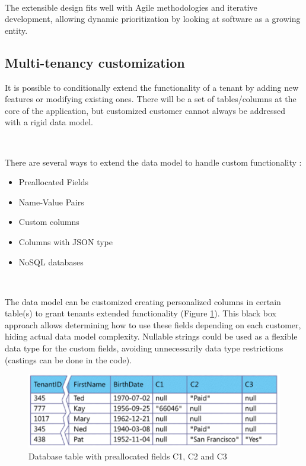 \documentclass[12pt,english]{article} %
\begin{document}

\

The extensible design fits well with Agile methodologies and iterative development, allowing dynamic prioritization \cite{philosophy-extensible-software} by looking at software as a growing entity.


\subsection{Multi-tenancy customization}
It is possible to conditionally extend the functionality of a tenant by adding new features or modifying existing ones.
There will be a set of tables/columns at the core of the application, but customized customer cannot always be addressed with a rigid data model.

\

There are several ways to extend the data model to handle custom functionality \cite{multi-tenant-data-architecture}:
\begin{itemize}
    \item Preallocated Fields
    \item Name‐Value Pairs
    \item Custom columns
    \item Columns with JSON type
    \item NoSQL databases
\end{itemize}

\

The data model can be customized creating personalized columns in certain table(s) to grant tenants extended functionality \cite{multi-tenant-data-architecture} (Figure \ref{fig:preallocated-database-fields}).
This black box approach allows determining how to use these fields depending on each customer, hiding actual data model complexity.
Nullable strings could be used as a flexible data type for the custom fields, avoiding unnecessarily data type restrictions (castings can be done in the code).

\begin{figure}[H]
    \centering
    \includegraphics[scale=0.5]{img/db/extensibility/preallocated-fields.png}
    \caption{Database table with preallocated fields C1, C2 and C3 \cite{multi-tenant-data-architecture}}
    \label{fig:preallocated-database-fields}
\end{figure}
\end{document}
